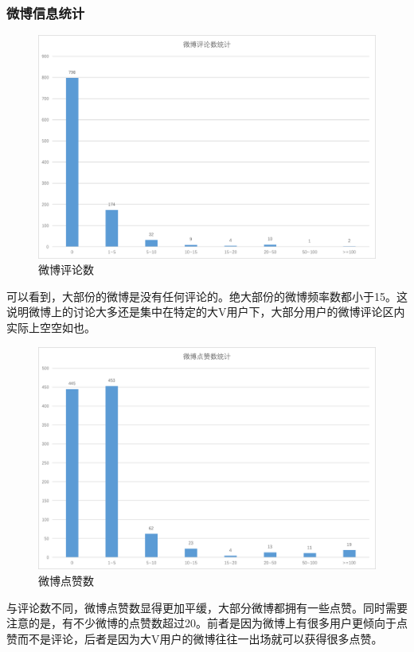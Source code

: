 \documentclass[a4paper,UTF8]{ctexart}
\begin{document}
\subsubsection{微博信息统计}\label{ux5faeux535aux4fe1ux606fux7edfux8ba1}

\begin{figure}[htbp]
\centering
\includegraphics{img/post_comment.png}
\caption{微博评论数}
\end{figure}

可以看到，大部份的微博是没有任何评论的。绝大部份的微博频率数都小于15。这说明微博上的讨论大多还是集中在特定的大V用户下，大部分用户的微博评论区内实际上空空如也。

\begin{figure}[htbp]
\centering
\includegraphics{img/post_like.png}
\caption{微博点赞数}
\end{figure}

与评论数不同，微博点赞数显得更加平缓，大部分微博都拥有一些点赞。同时需要注意的是，有不少微博的点赞数超过20。前者是因为微博上有很多用户更倾向于点赞而不是评论，后者是因为大V用户的微博往往一出场就可以获得很多点赞。
\end{document}
